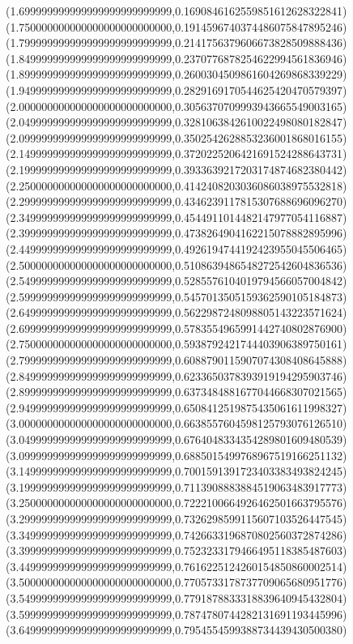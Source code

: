 \documentclass[11pt]{report}
\begin{document}
\begin{center}
  (1.699999999999999999999999999,0.1690846162559851612628322841)
  (1.750000000000000000000000000,0.1914596740374486075847895246)
  (1.799999999999999999999999999,0.2141756379606673828509888436)
  (1.849999999999999999999999999,0.2370776878254622994561836946)
  (1.899999999999999999999999999,0.2600304509861604269868339229)
  (1.949999999999999999999999999,0.2829169170544625420470579397)
  (2.000000000000000000000000000,0.3056370709993943665549003165)
  (2.049999999999999999999999999,0.3281063842610022498080182847)
  (2.099999999999999999999999999,0.3502542628853236001868016155)
  (2.149999999999999999999999999,0.3720225206421691524288643731)
  (2.199999999999999999999999999,0.3933639217203174874682380442)
  (2.250000000000000000000000000,0.4142408203036086038975532818)
  (2.299999999999999999999999999,0.4346239117815307688696096270)
  (2.349999999999999999999999999,0.4544911014482147977054116887)
  (2.399999999999999999999999999,0.4738264904162215078882895996)
  (2.449999999999999999999999999,0.4926194744192423955045506465)
  (2.500000000000000000000000000,0.5108639486548272542604836536)
  (2.549999999999999999999999999,0.5285576104019794566057004842)
  (2.599999999999999999999999999,0.5457013505159362590105184873)
  (2.649999999999999999999999999,0.5622987248098805143223571624)
  (2.699999999999999999999999999,0.5783554965991442740802876900)
  (2.750000000000000000000000000,0.5938792421744403906389750161)
  (2.799999999999999999999999999,0.6088790115907074308408645888)
  (2.849999999999999999999999999,0.6233650378393919194295903746)
  (2.899999999999999999999999999,0.6373484881677044668307021565)
  (2.949999999999999999999999999,0.6508412519875435061611998327)
  (3.000000000000000000000000000,0.6638557604598125793076126510)
  (3.049999999999999999999999999,0.6764048334354289801609480539)
  (3.099999999999999999999999999,0.6885015499768967519166251132)
  (3.149999999999999999999999999,0.7001591391723403383493824245)
  (3.199999999999999999999999999,0.7113908883884519063483917773)
  (3.250000000000000000000000000,0.7222100664926462501663795576)
  (3.299999999999999999999999999,0.7326298599115607103526447545)
  (3.349999999999999999999999999,0.7426633196870802560372874286)
  (3.399999999999999999999999999,0.7523233179466495118385487603)
  (3.449999999999999999999999999,0.7616225124260154850860002514)
  (3.500000000000000000000000000,0.7705733178737709065680951776)
  (3.549999999999999999999999999,0.7791878833318839640945432804)
  (3.599999999999999999999999999,0.7874780744282131691193445996)
  (3.649999999999999999999999999,0.7954554599388734439430500380)

\end{center}
\end{document}
